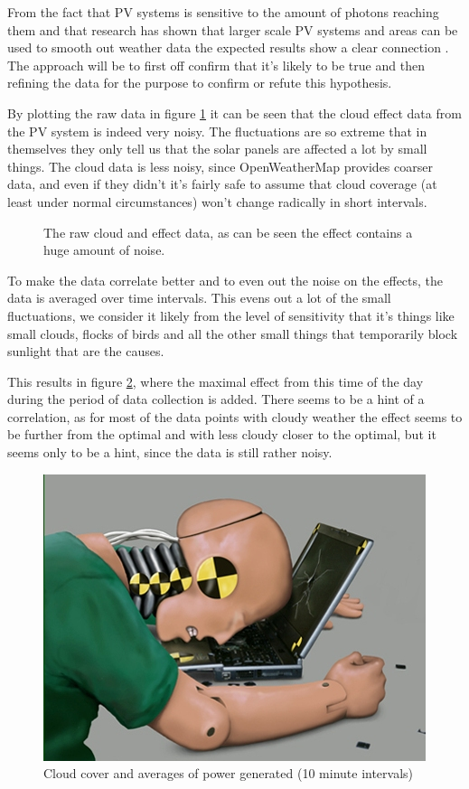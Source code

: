 From the fact that PV systems is sensitive to the amount of photons
reaching them and that research has shown that larger scale PV systems
and areas can be used to smooth out weather data the expected results
show a clear connection \citep{southafrica, cloudTrack, photovoltaic}.
The approach will be to first off confirm that it's likely to be true
and then refining the data for the purpose to confirm or refute this
hypothesis.

By plotting the raw data in figure \ref{fig:noise} it can be seen that
the cloud effect data from the PV system is indeed very noisy.  The
fluctuations are so extreme that in themselves they only tell us that
the solar panels are affected a lot by small things.  The cloud data
is less noisy, since OpenWeatherMap provides coarser data, and even if
they didn't it's fairly safe to assume that cloud coverage (at least
under normal circumstances) won't change radically in short intervals.

\begin{figure}
  \centering
  
  \caption{The raw cloud and effect data, as can be seen the effect
    contains a huge amount of noise.}
  \label{fig:noise}
\end{figure}

To make the data correlate better and to even out the noise on the
effects, the data is averaged over time intervals.  This evens out a
lot of the small fluctuations, we consider it likely from the level of
sensitivity that it's things like small clouds, flocks of birds and
all the other small things that temporarily block sunlight that are
the causes.

This results in figure \ref{fig:cloudsAndPower}, where the maximal
effect from this time of the day during the period of data collection
is added.  There seems to be a hint of a correlation, as for most of
the data points with cloudy weather the effect seems to be further
from the optimal and with less cloudy closer to the optimal, but it
seems only to be a hint, since the data is still rather noisy.

\begin{figure}
  \centering
  \includegraphics{dummy.jpg}
  \caption{Cloud cover and averages of power generated (10 minute
    intervals)}
  \label{fig:cloudsAndPower}
\end{figure}


